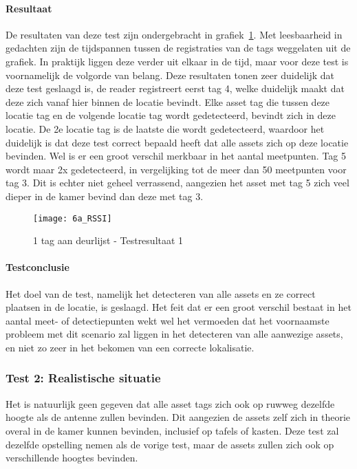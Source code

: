 \paragraph{Resultaat}
De resultaten van deze test zijn ondergebracht in grafiek~\ref{fig:ond-rfid-dynamic-6a-res}. Met leesbaarheid in gedachten zijn de tijdspannen tussen de registraties van de tags weggelaten uit de grafiek. In praktijk liggen deze verder uit elkaar in de tijd, maar voor deze test is voornamelijk de volgorde van belang. Deze resultaten tonen zeer duidelijk dat deze test geslaagd is, de reader registreert eerst tag 4, welke duidelijk maakt dat deze zich vanaf hier binnen de locatie bevindt. Elke asset tag die tussen deze locatie tag en de volgende locatie tag wordt gedetecteerd, bevindt zich in deze locatie. De 2e locatie tag is de laatste die wordt gedetecteerd, waardoor het duidelijk is dat deze test correct bepaald heeft dat alle assets zich op deze locatie bevinden. Wel is er een groot verschil merkbaar in het aantal meetpunten. Tag 5 wordt maar 2x gedetecteerd, in vergelijking tot de meer dan 50 meetpunten voor tag 3. Dit is echter niet geheel verrassend, aangezien het asset met tag 5 zich veel dieper in de kamer bevind dan deze met tag 3.

\begin{figure}[h]
	\texttt{[image: 6a\_RSSI]}
	\caption{1 tag aan deurlijst - Testresultaat 1}
	\label{fig:ond-rfid-dynamic-6a-res}
\end{figure}

\paragraph{Testconclusie}
Het doel van de test, namelijk het detecteren van alle assets en ze correct plaatsen in de locatie, is geslaagd. Het feit dat er een groot verschil bestaat in het aantal meet- of detectiepunten wekt wel het vermoeden dat het voornaamste probleem met dit scenario zal liggen in het detecteren van alle aanwezige assets, en niet zo zeer in het bekomen van een correcte lokalisatie.

\subsubsection{Test 2: Realistische situatie}
\label{sec:ond-rfid-4-2}
Het is natuurlijk geen gegeven dat alle asset tags zich ook op ruwweg dezelfde hoogte als de antenne zullen bevinden. Dit aangezien de assets zelf zich in theorie overal in de kamer kunnen bevinden, inclusief op tafels of kasten. Deze test zal dezelfde opstelling nemen als de vorige test, maar de assets zullen zich ook op verschillende hoogtes bevinden.

